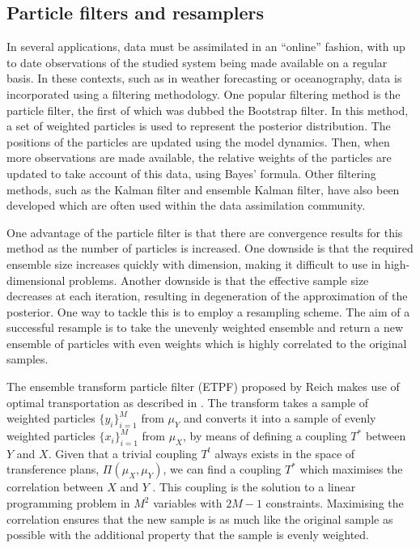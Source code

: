 \documentclass[final]{siamltex}
\begin{document}
\subsection{Particle filters and resamplers}\label{sec:filters}
In several applications, data must be assimilated in an ``online''
fashion, with up to date observations of the studied system being made
available on a regular basis. In these contexts, such as in weather forecasting or
oceanography, data is incorporated using a filtering
methodology. One popular filtering method is the particle filter, the
first of which was dubbed the Bootstrap
filter\cite{gordon1993novel}. In this method, a set of weighted particles is
used to represent the posterior distribution. The positions of the
particles are updated using the model dynamics. Then, when more
observations are made available, the relative weights of the particles
are updated to take account of this data, using Bayes' formula. Other filtering methods, such
as the Kalman filter\cite{kalman1960new} and ensemble Kalman filter\cite{evensen1994sequential}, have also been developed which are often used within the data
assimilation community.

One advantage of the particle filter is that there are convergence
results for this method as the number of particles is increased.  One downside is that the required ensemble
size increases quickly with dimension, making it difficult to use in
high-dimensional problems. Another
downside is that the effective sample size decreases at each
iteration, resulting in degeneration of the approximation of the
posterior. One way to tackle
this is to employ a resampling scheme. The aim of a successful
resample is to take the unevenly weighted ensemble and return a new
ensemble of particles with even weights which is highly correlated to
the original samples.

The ensemble transform particle filter (ETPF) proposed by Reich
\cite{reich2013nonparametric} makes use of optimal transportation as
described in \cite{villani2003topics,villani2008optimal}. The transform
takes a sample of weighted particles $\{y_i\}_{i=1}^M$ from $\mu_Y$
and converts it into a sample of evenly weighted particles $\{x_i\}_{i=1}^M$
from $\mu_X$, by means of defining a coupling $T^*$ between $Y$ and
$X$. Given that a trivial coupling $T^t$ always exists in the space of
transference plans, $\Pi(\mu_{X}, \mu_{Y})$, we can find a coupling
$T^*$ which maximises the correlation between $X$ and $Y$
\cite{cotter2012ensemble}. This coupling is the solution to a linear
programming problem in $M^2$ variables with $2M-1$ constraints.
Maximising the correlation ensures that the new sample is as much like
the original sample as possible with the additional property that the sample
is evenly weighted.
\end{document}
